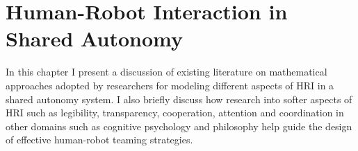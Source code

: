 \documentclass[12pt]{article}
\newcommand{\DGc}[1]{{\textbf{\color{blue}{#1}}}}
\newcommand{\POINTS}[1]{{\textbf{\color{red}{#1}}}}
\begin{document}






\pagebreak

\section{Human-Robot Interaction in Shared Autonomy}
\label{sec:HRI_SA}

In this chapter I present a discussion of existing literature on mathematical approaches adopted by researchers for modeling different aspects of HRI in a shared autonomy system.  
I also briefly discuss how research into softer aspects of HRI such as legibility, transparency, cooperation, attention and coordination in other domains such as cognitive psychology and philosophy help guide the design of effective human-robot teaming strategies. 

\end{document}

